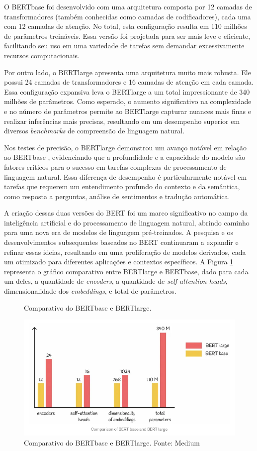 O BERTbase foi desenvolvido com uma arquitetura composta por 12 camadas de transformadores (também conhecidas como camadas de codificadores), cada uma com 12 camadas de atenção. No total, esta configuração resulta em 110 milhões de parâmetros treináveis. Essa versão foi projetada para ser mais leve e eficiente, facilitando seu uso em uma variedade de tarefas sem demandar excessivamente recursos computacionais.

Por outro lado, o BERTlarge apresenta uma arquitetura muito mais robusta. Ele possui 24 camadas de transformadores e 16 camadas de atenção em cada camada. Essa configuração expansiva leva o BERTlarge a um total impressionante de 340 milhões de parâmetros. Como esperado, o aumento significativo na complexidade e no número de parâmetros permite ao BERTlarge capturar nuances mais finas e realizar inferências mais precisas, resultando em um desempenho superior em diversos \textit{benchmarks} de compreensão de linguagem natural.

Nos testes de precisão, o BERTlarge demonstrou um avanço notável em relação ao BERTbase \cite{joshi2019bertcoreferenceresolutionbaselines}, evidenciando que a profundidade e a capacidade do modelo são fatores críticos para o sucesso em tarefas complexas de processamento de linguagem natural. Essa diferença de desempenho é particularmente notável em tarefas que requerem um entendimento profundo do contexto e da semântica, como resposta a perguntas, análise de sentimentos e tradução automática.

A criação dessas duas versões do BERT foi um marco significativo no campo da inteligência artificial e do processamento de linguagem natural, abrindo caminho para uma nova era de modelos de linguagem pré-treinados. A pesquisa e os desenvolvimentos subsequentes baseados no BERT continuaram a expandir e refinar essas ideias, resultando em uma proliferação de modelos derivados, cada um otimizado para diferentes aplicações e contextos específicos. A Figura \ref{fig:bert4} representa o gráfico comparativo entre  BERTlarge e BERTbase, dado para cada um deles, a quantidade de \textit{encoders}, a quantidade de \textit{self-attention heads}, dimensionalidade dos \textit{embeddings}, e total de parâmetros.

\begin{figure}[H]
    \centering
    \caption{Comparativo do BERTbase e BERTlarge.}
    \includegraphics[width=\linewidth]{img/BERT/bert4.png}
    \caption*{Comparativo do BERTbase e BERTlarge. Fonte: Medium \cite{Rani2018}}
    \label{fig:bert4}
\end{figure}

